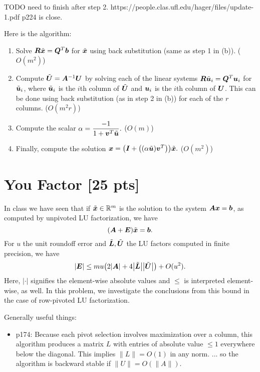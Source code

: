 \documentclass[twoside,10pt]{article}
\begin{document}
TODO need to finish after step 2.
https://people.clas.ufl.edu/hager/files/update-1.pdf p224 is close.

\quad Here is the algorithm:
\begin{enumerate}
  \item Solve $\bm{R}\tilde{\bm{x}} = \bm{Q}^T\bm{b}$ for $\tilde{\bm{x}}$ using back substitution (same as step 1 in (b)). ($O(m^2)$)
  \item Compute $\tilde{\bm{U}} = \bm{A}^{-1}\bm{U}$ by solving each of the linear systems $\bm{R}\tilde{\bm{u}}_i = \bm{Q}^T\bm{u}_i$ for $\tilde{\bm{u}}_i$, where $\tilde{\bm{u}}_i$ is the $i$th column of $\tilde{\bm{U}}$ and $\bm{u}_i$ is the $i$th column of $\bm{U}$.
  This can be done using back substitution (as in step 2 in (b)) for each of the $r$ columns. ($O(m^2r)$)
  \item Compute the scalar $\alpha = \dfrac{-1}{1+\bm{v}^T\tilde{\bm{u}}}.$ ($O(m)$)
  \item Finally, compute the solution $\vct{x} = \left(\vct{I} + \left(\left(\alpha\tilde{\vct{u}}\right)\vct{v}^T\right)\right)\tilde{\vct{x}}.$ ($O(m^2)$)
\end{enumerate}

\section{You Factor [25 pts]}
In class we have seen that if $\tilde{\bm{x}} \in \mathbb{R}^{m}$ is the solution to the system $\bm{A}\bm{x} = \bm{b}$, as computed by unpivoted LU factorization, we have  
\begin{equation}
  \left(\mtx{A} + \mtx{E}\right)\tilde{\vct{x}} = \vct{b}.  
\end{equation}
For $u$ the unit roundoff error and $\tilde{\bm{L}}, \tilde{\bm{U}}$ the LU factors computed in finite precision, we have
\begin{equation}
  \left|\mtx{E}\right| \leq m u \left(2 \left|\mtx{A}\right| + 4 \left|\tilde{\mtx{L}} \right| \left|\tilde{\mtx{U}}\right|\right) + O(u^2).
\end{equation}
Here, $|\cdot|$ signifies the element-wise absolute values and $\leq$ is interpreted element-wise, as well.
In this problem, we investigate the conclusions from this bound in the case of row-pivoted LU factorization.

Generally useful things:
\begin{itemize}
  \item p174: Because each pivot selection involves maximization over a column, this algorithm produces a matrix $L$ with entries of absolute value $\leq 1$ everywhere below the diagonal.
      This implies $\|L\| = O(1)$ in any norm.
      ... so the algorithm is backward stable if $\|U\| = O(\|A\|)$.
\end{itemize}
\end{document}
